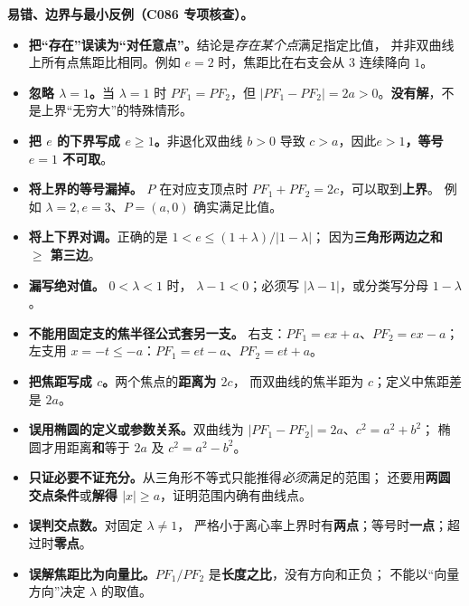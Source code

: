 \clearpage
\begin{trapbox}
\textbf{易错、边界与最小反例（C086 专项核查）。}
\begin{itemize}
\item \textbf{把“存在”误读为“对任意点”。}结论是\emph{存在某个点}满足指定比值，
并非双曲线上所有点焦距比相同。例如 $e=2$ 时，焦距比在右支会从 $3$ 连续降向 $1$。

\item \textbf{忽略 $\lambda=1$。}当 $\lambda=1$ 时 $PF_1=PF_2$，但
$|PF_1-PF_2|=2a>0$。\textbf{没有解}，不是上界“无穷大”的特殊情形。

\item \textbf{把 $e$ 的下界写成 $e\ge1$。}非退化双曲线 $b>0$ 导致
$c>a$，因此\textbf{$e>1$，等号 $e=1$ 不可取}。

\item \textbf{将上界的等号漏掉。} $P$ 在对应支顶点时
$PF_1+PF_2=2c$，可以取到\textbf{上界}。
例如 $\lambda=2,e=3$、$P=(a,0)$ 确实满足比值。

\item \textbf{将上下界对调。}正确的是 $1<e\le(1+\lambda)/|1-\lambda|$；
因为\textbf{三角形两边之和 $\ge$ 第三边}。

\item \textbf{漏写绝对值。} $0<\lambda<1$ 时，
$\lambda-1<0$；必须写 $|\lambda-1|$，或分类写分母 $1-\lambda$。

\item \textbf{不能用固定支的焦半径公式套另一支。}
右支：$PF_1=ex+a$、$PF_2=ex-a$；
左支用 $x=-t\le-a$：$PF_1=et-a$、$PF_2=et+a$。

\item \textbf{把焦距写成 $c$。}两个焦点的\textbf{距离为 $2c$}，
而双曲线的焦半距为 $c$；定义中焦距差是 $2a$。

\item \textbf{误用椭圆的定义或参数关系。}双曲线为
$|PF_1-PF_2|=2a$、$c^2=a^2+b^2$；
椭圆才用距离\textbf{和}等于 $2a$ 及 $c^2=a^2-b^2$。

\item \textbf{只证必要不证充分。}从三角形不等式只能推得\emph{必须}满足的范围；
还要用\textbf{两圆交点条件}或\textbf{解得 $|x|\ge a$}，证明范围内确有曲线点。

\item \textbf{误判交点数。}对固定 $\lambda\ne1$，
严格小于离心率上界时有\textbf{两点}；等号时\textbf{一点}；超过时\textbf{零点}。

\item \textbf{误解焦距比为向量比。}$PF_1/PF_2$ 是\textbf{长度之比}，没有方向和正负；
不能以“向量方向”决定 $\lambda$ 的取值。


\end{itemize}
\end{trapbox}

